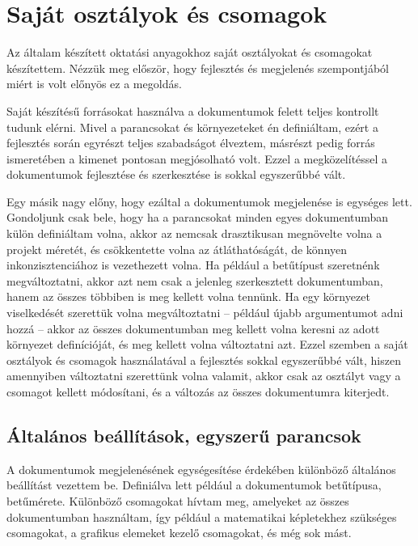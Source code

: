 \section{Saját osztályok és csomagok}

Az általam készített oktatási anyagokhoz saját osztályokat és csomagokat
készítettem. Nézzük meg először, hogy fejlesztés és megjelenés szempontjából
miért is volt előnyös ez a megoldás.

Saját készítésű forrásokat használva a dokumentumok felett teljes kontrollt
tudunk elérni. Mivel a parancsokat és környezeteket én definiáltam, ezért
a fejlesztés során egyrészt teljes szabadságot élveztem, másrészt pedig
forrás ismeretében a kimenet pontosan megjósolható volt. Ezzel a megközelítéssel
a dokumentumok fejlesztése és szerkesztése is sokkal egyszerűbbé vált.

Egy másik nagy előny, hogy ezáltal a dokumentumok megjelenése is egységes lett.
Gondoljunk csak bele, hogy ha a parancsokat minden egyes dokumentumban külön
definiáltam volna, akkor az nemcsak drasztikusan megnövelte volna a projekt
méretét, és csökkentette volna az átláthatóságát, de könnyen inkonzisztenciához
is vezethezett volna. Ha például a betűtípust szeretnénk megváltoztatni, akkor
azt nem csak a jelenleg szerkesztett dokumentumban, hanem az összes többiben
is meg kellett volna tennünk. Ha egy környezet viselkedését szerettük volna
megváltoztatni -- például újabb argumentumot adni hozzá -- akkor az összes
dokumentumban meg kellett volna keresni az adott környezet definícióját, és
meg kellett volna változtatni azt. Ezzel szemben a saját osztályok és csomagok
használatával a fejlesztés sokkal egyszerűbbé vált, hiszen amennyiben
változtatni szerettünk volna valamit, akkor csak az osztályt vagy a csomagot
kellett módosítani, és a változás az összes dokumentumra kiterjedt.

\subsection{Általános beállítások, egyszerű parancsok}

A dokumentumok megjelenésének egységesítése érdekében különböző általános
beállítást vezettem be. Definiálva lett például a dokumentumok betűtípusa,
betűmérete. Különböző csomagokat hívtam meg, amelyeket az összes dokumentumban
használtam, így például a matematikai képletekhez szükséges csomagokat, a
grafikus elemeket kezelő csomagokat, és még sok mást.

